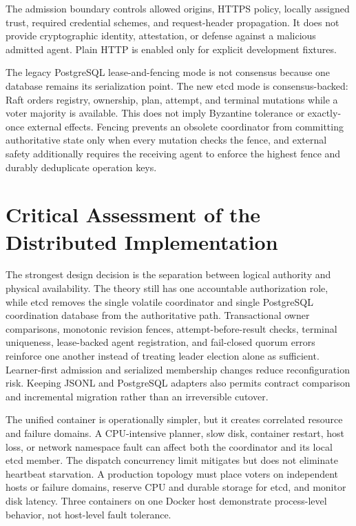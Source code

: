 The admission boundary controls allowed origins, HTTPS policy, locally assigned trust, required credential schemes, and request-header propagation. It does not provide cryptographic identity, attestation, or defense against a malicious admitted agent. Plain HTTP is enabled only for explicit development fixtures.

The legacy PostgreSQL lease-and-fencing mode is not consensus because one database remains its serialization point. The new etcd mode is consensus-backed: Raft orders registry, ownership, plan, attempt, and terminal mutations while a voter majority is available. This does not imply Byzantine tolerance or exactly-once external effects. Fencing prevents an obsolete coordinator from committing authoritative state only when every mutation checks the fence, and external safety additionally requires the receiving agent to enforce the highest fence and durably deduplicate operation keys.

\section{Critical Assessment of the Distributed Implementation}

The strongest design decision is the separation between logical authority and physical availability. The theory still has one accountable authorization role, while etcd removes the single volatile coordinator and single PostgreSQL coordination database from the authoritative path. Transactional owner comparisons, monotonic revision fences, attempt-before-result checks, terminal uniqueness, lease-backed agent registration, and fail-closed quorum errors reinforce one another instead of treating leader election alone as sufficient. Learner-first admission and serialized membership changes reduce reconfiguration risk. Keeping JSONL and PostgreSQL adapters also permits contract comparison and incremental migration rather than an irreversible cutover.

The unified container is operationally simpler, but it creates correlated resource and failure domains. A CPU-intensive planner, slow disk, container restart, host loss, or network namespace fault can affect both the coordinator and its local etcd member. The dispatch concurrency limit mitigates but does not eliminate heartbeat starvation. A production topology must place voters on independent hosts or failure domains, reserve CPU and durable storage for etcd, and monitor disk latency. Three containers on one Docker host demonstrate process-level behavior, not host-level fault tolerance.


